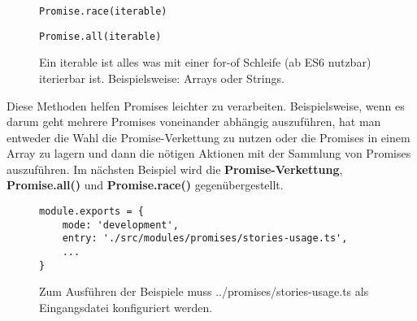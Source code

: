 \begin{description}

\begin{figure}[H]
\item \begin{lstlisting}[basicstyle=\small]
Promise.race(iterable)
\end{lstlisting}

\item \begin{lstlisting}[basicstyle=\small]
Promise.all(iterable)
\end{lstlisting}
\caption{Ein iterable ist alles was mit einer for-of Schleife (ab ES6 nutzbar) iterierbar ist. Beispielsweise: Arrays oder Strings.}
\end{figure}
\end{description}

\noindent
Diese Methoden helfen Promises leichter zu verarbeiten. Beispielsweise, wenn es darum geht mehrere Promises voneinander abhängig auszuführen, hat man entweder die Wahl die Promise-Verkettung zu nutzen oder die Promises in einem Array zu lagern und dann die nötigen Aktionen mit der Sammlung von Promises auszuführen. Im nächsten Beispiel wird die \textbf{Promise-Verkettung}, \textbf{Promise.all()} und \textbf{Promise.race()} gegenübergestellt.

\begin{figure}[H]
\begin{lstlisting}[basicstyle=\small]
module.exports = {
    mode: 'development',
    entry: './src/modules/promises/stories-usage.ts',
    ...
}
\end{lstlisting}
\caption{Zum Ausführen der Beispiele muss ../promises/stories-usage.ts als Eingangsdatei konfiguriert werden.}
\end{figure}

